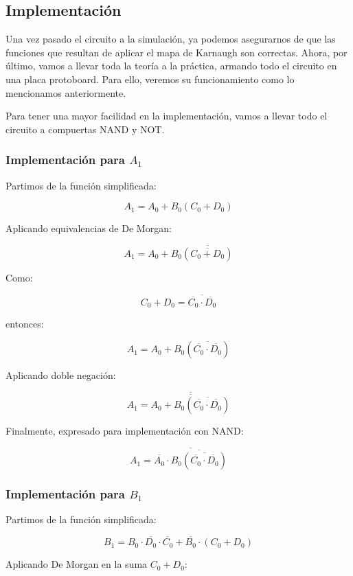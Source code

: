 \documentclass[a4paper,12pt]{article}
\begin{document}
\subsection{Implementación}

Una vez pasado el circuito a la simulación, ya podemos asegurarnos de que las funciones que resultan de aplicar el mapa de Karnaugh son correctas. Ahora, por último, vamos a llevar toda la teoría a la práctica, armando todo el circuito en una placa protoboard. Para ello, veremos su funcionamiento como lo mencionamos anteriormente.

Para tener una mayor facilidad en la implementación, vamos a llevar todo el circuito a compuertas NAND y NOT.

\subsubsection{Implementación para $A_1$}

Partimos de la función simplificada:

\[
A_1 = A_0 + B_0(C_0 + D_0)
\]

Aplicando equivalencias de De Morgan:

\[
A_1 = A_0 + B_0\overline{(\overline{C_0 + D_0})}
\]

Como:

\[
C_0 + D_0 = \overline{\overline{C_0}\cdot \overline{D_0}}
\]

entonces:

\[
A_1 = A_0 + B_0\left(\overline{\overline{C_0}\cdot \overline{D_0}}\right)
\]

Aplicando doble negación:

\[
A_1 = \overline{\overline{A_0 + B_0\left(\overline{\overline{C_0}\cdot \overline{D_0}}\right)}}
\]

Finalmente, expresado para implementación con NAND:

\[
A_1 =
\overline{
	\overline{A_0}\cdot
	\overline{
		B_0\left(\overline{\overline{C_0}\cdot \overline{D_0}}\right)
	}
}
\]

\subsubsection{Implementación para $B_1$}

Partimos de la función simplificada:

\[
B_1 = B_0\cdot \overline{D_0}\cdot \overline{C_0}
+
\overline{B_0}\cdot (C_0 + D_0)
\]

Aplicando De Morgan en la suma $C_0 + D_0$:
\end{document}
